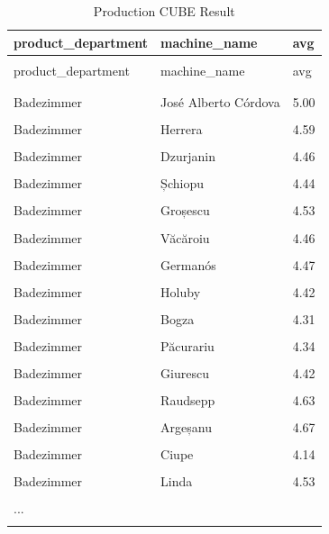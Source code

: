 \documentclass[letterpaper,12pt]{article}
\begin{document}
\begingroup
\renewcommand\arraystretch{0.5}
\begin{longtable}{p{4cm}p{4cm}p{4cm}}
        \caption{Production CUBE Result} \\
				product\_department & machine\_name & avg \\
        \endfirsthead \\
        product\_department & machine\_name & avg \\
        \endhead \\
				\hline \\
Badezimmer & José Alberto Córdova & 5.00 \\
\hline \\
Badezimmer & Herrera & 4.59 \\
\hline \\
Badezimmer & Dzurjanin & 4.46 \\
\hline \\
Badezimmer & Șchiopu & 4.44 \\
\hline \\
Badezimmer & Groșescu & 4.53 \\
\hline \\
Badezimmer & Văcăroiu & 4.46 \\
\hline \\
Badezimmer & Germanós & 4.47 \\
\hline \\
Badezimmer & Holuby & 4.42 \\
\hline \\
Badezimmer & Bogza & 4.31 \\
\hline \\
Badezimmer & Păcurariu & 4.34 \\
\hline \\
Badezimmer & Giurescu & 4.42 \\
\hline \\
Badezimmer & Raudsepp & 4.63 \\
\hline \\
Badezimmer & Argeșanu & 4.67 \\
\hline \\
Badezimmer & Ciupe & 4.14 \\
\hline \\
Badezimmer & Linda & 4.53 \\
\hline \\
... & & \\
\hline \\
\end{longtable} 
\endgroup  
\end{document}
